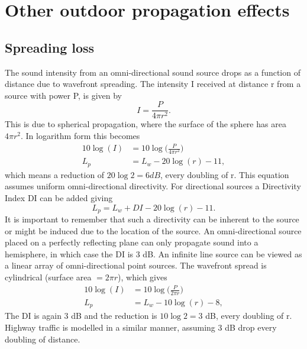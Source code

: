 \section{Other outdoor propagation effects}
\subsection{Spreading loss} 
The sound intensity from an omni-directional sound source drops as a function of distance due to wavefront spreading. The intensity I received at distance r from a source with power P, is given by
\begin{equation}
    I = \frac{P}{4\pi r^2}.
\end{equation}
This is due to spherical propagation, where the surface of the sphere has area $4\pi r^2$. In logarithm form this becomes
\begin{equation}
\begin{split}
    10\log(I) &= 10\log\bigg(\frac{P}{4\pi r^2}\bigg) \\
    L_p &= L_w - 20 \log(r) - 11,
\end{split}
\end{equation}
which means a reduction of $20\log2 = 6 dB$, every doubling of r. This equation assumes uniform omni-directional directivity. For directional sources a Directivity Index DI can be added giving
\begin{equation}
    L_p = L_w + DI - 20 \log(r) - 11.
\end{equation}
It is important to remember that such a directivity can be inherent to the source or might be induced due to the location of the source. An omni-directional source placed on a perfectly reflecting plane can only propagate sound into a hemisphere, in which case the DI is 3 dB.  
An infinite line source can be viewed as a linear array of omni-directional point sources. The wavefront spread is cylindrical (surface area $= 2\pi r$),  which gives
\begin{equation}
\begin{split}
    10\log(I) &= 10\log\bigg(\frac{P}{2\pi r}\bigg) \\
    L_p &= L_w - 10 \log(r) - 8,
\end{split}
\end{equation}
The DI is again 3 dB and the reduction is $10\log2 = 3$ dB, every doubling of r. Highway traffic is modelled in a similar manner, assuming 3 dB drop every doubling of distance.

